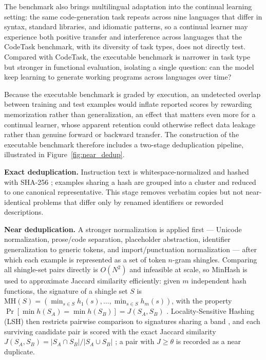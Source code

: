 The benchmark also brings multilingual adaptation into the continual learning setting: the same code-generation task repeats across nine languages that differ in syntax, standard libraries, and idiomatic patterns, so a continual learner may experience both positive transfer and interference across languages that the CodeTask benchmark, with its diversity of task types, does not directly test. Compared with CodeTask, the executable benchmark is narrower in task type but stronger in functional evaluation, isolating a single question: can the model keep learning to generate working programs across languages over time?

Because the executable benchmark is graded by execution, an undetected overlap between training and test examples would inflate reported scores by rewarding memorization rather than generalization, an effect that matters even more for a continual learner, whose apparent retention could otherwise reflect data leakage rather than genuine forward or backward transfer. The construction of the executable benchmark therefore includes a two-stage deduplication pipeline, illustrated in Figure~\ref{fig:near_dedup}.

\textbf{Exact deduplication.} Instruction text is whitespace-normalized and hashed with SHA-256 \citep{nist2015securehash}; examples sharing a hash are grouped into a cluster and reduced to one canonical representative. This stage removes verbatim copies but not near-identical problems that differ only by renamed identifiers or reworded descriptions.

\textbf{Near deduplication.} A stronger normalization is applied first --- Unicode normalization, prose/code separation, placeholder abstraction, identifier generalization to generic tokens, and import/punctuation normalization --- after which each example is represented as a set of token $n$-gram shingles. Comparing all shingle-set pairs directly is $O(N^2)$ and infeasible at scale, so MinHash is used to approximate Jaccard similarity efficiently: given $m$ independent hash functions, the signature of a shingle set $S$ is $\mathrm{MH}(S)=(\min_{s\in S}h_1(s),\ldots,\min_{s\in S}h_m(s))$, with the property $\Pr[\min h(S_A)=\min h(S_B)]=J(S_A,S_B)$ \citep{broder1997resemblance}. Locality-Sensitive Hashing (LSH) then restricts pairwise comparison to signatures sharing a band \citep{indyk1998approximate}, and each surviving candidate pair is scored with the exact Jaccard similarity $J(S_A,S_B)=|S_A\cap S_B|/|S_A\cup S_B|$ \citep{jaccard1901distribution}; a pair with $J\geq\theta$ is recorded as a near duplicate.

